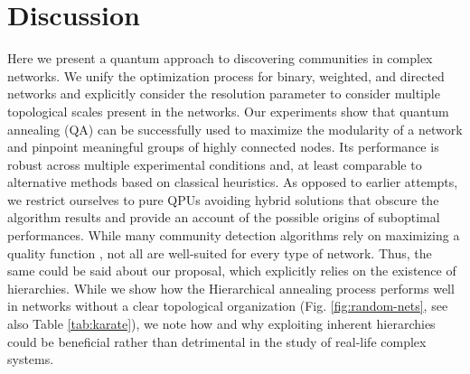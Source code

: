 \documentclass[pdflatex,sn-mathphys-num]{sn-jnl}%
\begin{document}
\section*{Discussion} \label{sec:discussion}

Here we present a quantum approach to discovering communities in complex networks. We unify the optimization process for binary, weighted, and directed networks and explicitly consider the resolution parameter to consider multiple topological scales present in the networks. Our experiments show that quantum annealing (QA) can be successfully used to maximize the modularity of a network and pinpoint meaningful groups of highly connected nodes. Its performance is robust across multiple experimental conditions and, at least comparable to alternative methods based on classical heuristics. As opposed to earlier attempts, we restrict ourselves to pure QPUs avoiding hybrid solutions that obscure the algorithm results \cite{Negre2020,Wierzbinski2023} and provide an account of the possible origins of suboptimal performances. While many community detection algorithms rely on maximizing a quality function \cite{Fortunato2010}, not all are well-suited for every type of network. Thus, the same could be said about our proposal, which explicitly relies on the existence of hierarchies. While we show how the Hierarchical annealing process performs well in networks without a clear topological organization (Fig. \ref{fig:random-nets}, see also Table \ref{tab:karate}), we note how and why exploiting inherent hierarchies could be beneficial rather than detrimental in the study of real-life complex systems. 
\end{document}
